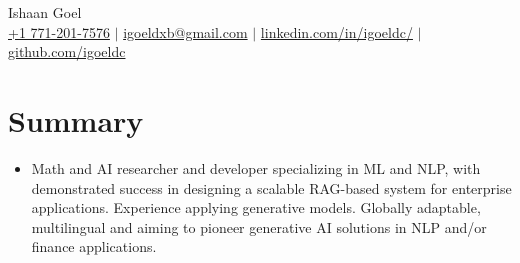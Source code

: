 \documentclass[letterpaper,10pt]{article}
\newcommand\indentsize{10pt}
\newcommand{\resumeSubHeadingListStart}{\begin{itemize}[leftmargin=0.15in, label=]}
\newcommand{\resumeSubHeadingListEnd}{\end{itemize}}
\begin{document}

\begin{center}
    \Huge Ishaan Goel \\ \vspace{2pt}
    \large
    \href{tel:17712017576}{+1 771-201-7576}
    $|$ \href{mailto:igoeldxb@gmail.com}{igoeldxb@gmail.com}
    $|$ \href{https://linkedin.com/in/igoeldc/}{linkedin.com/in/igoeldc/}
    $|$ \href{https://github.com/igoeldc}{github.com/igoeldc}
\end{center}

\section{Summary}
  \resumeSubHeadingListStart
    \item{Math and AI researcher and developer specializing in ML and NLP, with demonstrated success in designing a scalable RAG-based system for enterprise applications. Experience applying generative models. Globally adaptable, multilingual and aiming to pioneer generative AI solutions in NLP and/or finance applications.}\vspace{-5pt}
  \resumeSubHeadingListEnd

\newcommand{\resumeEducationHeading}[9]{
  \item
    \begin{tabular*}{0.97\textwidth}[t]{l@{\extracolsep{\fill}}r}
      \textbf{#1} {#2} & #3 \\
      \hspace{\indentsize} #4 & #5 \\
      \hspace{20pt} #6 & \\
      \hspace{20pt} \textit{#7} & \\
      \hspace{\indentsize} #8 & #9
    \end{tabular*}
}
\end{document}
